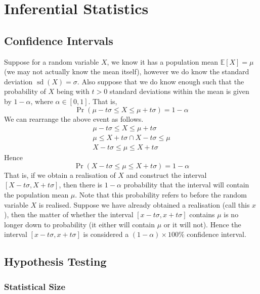 \documentclass[11pt]{report} %
\begin{document}
\section{Inferential Statistics}

\subsection{Confidence Intervals}

Suppose for a random variable $X$, we know it has a population mean $\mathbb{E}\left[X\right] = \mu$ (we may not actually know the mean itself), however we do know the standard deviation $\operatorname{sd}\left(X\right) = \sigma$. Also suppose that we do know enough such that the probability of $X$ being with $t > 0$ standard deviations within the mean is given by $1 - \alpha$, where $\alpha \in \left[0, 1\right]$. That is,
\begin{equation}
\operatorname{Pr}\left(\mu - t\sigma \leq X \leq \mu + t\sigma\right) = 1 - \alpha
\end{equation}
We can rearrange the above event as follows.
\begin{gather}
\mu - t\sigma \leq X \leq \mu + t\sigma \\
\mu \leq X + t\sigma \cap X - t\sigma \leq \mu \\
X - t\sigma \leq \mu \leq X + t\sigma
\end{gather}
Hence
\begin{equation}
\operatorname{Pr}\left(X - t\sigma \leq \mu \leq X + t\sigma\right) = 1 - \alpha
\end{equation}
That is, if we obtain a realisation of $X$ and construct the interval $\left[X - t\sigma, X + t\sigma\right]$, then there is $1 - \alpha$ probability that the interval will contain the population mean $\mu$. Note that this probability refers to before the random variable $X$ is realised. Suppose we have already obtained a realisation (call this $x$), then the matter of whether the interval 
$\left[x - t\sigma, x + t\sigma\right]$ contains $\mu$ is no longer down to probability (it either will contain $\mu$ or it will not). Hence the interval $\left[x - t\sigma, x + t\sigma\right]$ is considered a $\left(1 - \alpha\right)\times 100\%$ confidence interval.

\subsection{Hypothesis Testing}

\subsubsection{Statistical Size}
\end{document}
